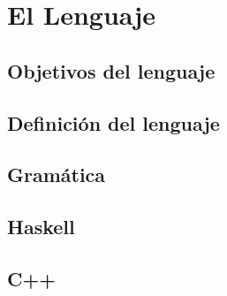 
\chapter{El Lenguaje}

\section{Objetivos del lenguaje}

\section{Definición del lenguaje}

\section{Gramática}

\section{Haskell}

\section{C++}


